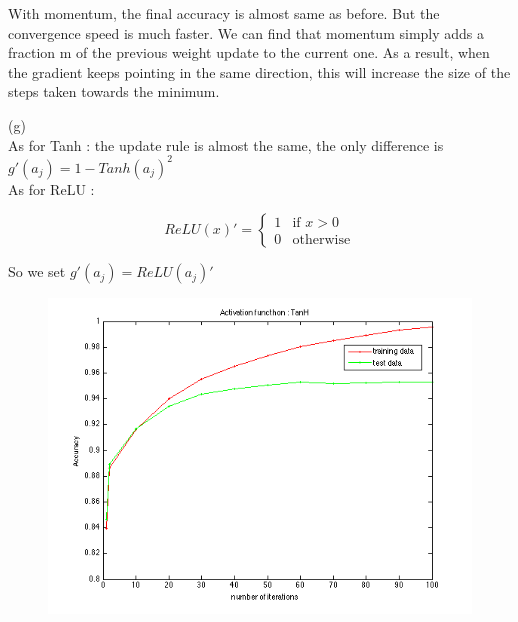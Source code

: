 \documentclass{article} %
\begin{document}
With momentum, the final accuracy is almost same as before. But the convergence speed is much faster. We can find that momentum simply adds a fraction m of the previous weight update to the current one. As a result, when the gradient keeps pointing in the same direction, this will increase the size of the steps taken towards the minimum.

(g) \\

As for Tanh : the update rule is almost the same, the only difference is $g'(a_j)  = 1 - Tanh(a_j)^2$  \\

As for ReLU : 

\begin{equation}
    ReLU(x)'=
   \begin{cases}
   1 &\mbox{if $x > 0$}\\
   0 &\mbox{otherwise}
   \end{cases}
  \end{equation}
  
  So we set $g'(a_j)  = ReLU(a_j)'$ \\

\begin{figure}[htbp] %
   \centering
   \includegraphics[width=5in]{img/p71.png} 
\end{figure}
\end{document}
